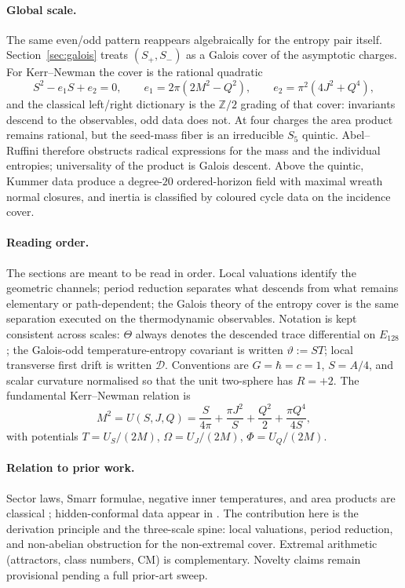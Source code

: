 \documentclass[11pt,a4paper]{article}
\theoremstyle{definition}
\theoremstyle{remark}
\newcommand{\ZZ}{\mathbb{Z}}
\begin{document}
\paragraph{Global scale.}
The same even/odd pattern reappears algebraically for the entropy pair itself.
Section~\ref{sec:galois} treats \((S_+,S_-)\) as a Galois cover of the
asymptotic charges. For Kerr--Newman the cover is the rational quadratic
\begin{equation}
S^2-e_1S+e_2=0,\qquad
e_1=2\pi(2M^2-Q^2),\qquad
e_2=\pi^2(4J^2+Q^4),
\label{eq:intro-quad}
\end{equation}
and the classical left/right dictionary is the \(\ZZ/2\) grading of that cover:
invariants descend to the observables, odd data does not. At four charges the
area product remains rational, but the seed-mass fiber is an irreducible
\(S_5\) quintic. Abel--Ruffini therefore obstructs radical expressions for the
mass and the individual entropies; universality of the product is Galois
descent. Above the quintic, Kummer data produce a degree-\(20\) ordered-horizon
field with maximal wreath normal closures, and inertia is classified by
coloured cycle data on the incidence cover.

\paragraph{Reading order.}
The sections are meant to be read in order. Local valuations identify the
geometric channels; period reduction separates what descends from what remains
elementary or path-dependent; the Galois theory of the entropy cover is the
same separation executed on the thermodynamic observables. Notation is kept
consistent across scales: \(\Theta\) always denotes the descended trace
differential on \(E_{128}\); the Galois-odd temperature-entropy covariant is
written \(\vartheta:=ST\); local transverse first drift is written
\(\mathcal D\). Conventions are \(G=\hbar=c=1\), \(S=A/4\), and scalar
curvature normalised so that the unit two-sphere has \(R=+2\). The fundamental
Kerr--Newman relation is
\begin{equation}
M^2=U(S,J,Q)
=\frac{S}{4\pi}+\frac{\pi J^2}{S}+\frac{Q^2}{2}+\frac{\pi Q^4}{4S},
\label{eq:U}
\end{equation}
with potentials \(T=U_S/(2M)\), \(\Omega=U_J/(2M)\), \(\Phi=U_Q/(2M)\).

\paragraph{Relation to prior work.}
Sector laws, Smarr formulae, negative inner temperatures, and area products
are classical \cite{CL1,CL2,CGLP2018,AH,CGP2011,CR2012}; hidden-conformal data
appear in \cite{CMS,WangLiu,ChenLong4Q}. The contribution here is the
derivation principle and the three-scale spine: local valuations, period
reduction, and non-abelian obstruction for the non-extremal cover. Extremal
arithmetic (attractors, class numbers, CM) \cite{Moore,BKO} is complementary.
Novelty claims remain provisional pending a full prior-art sweep.
\end{document}
